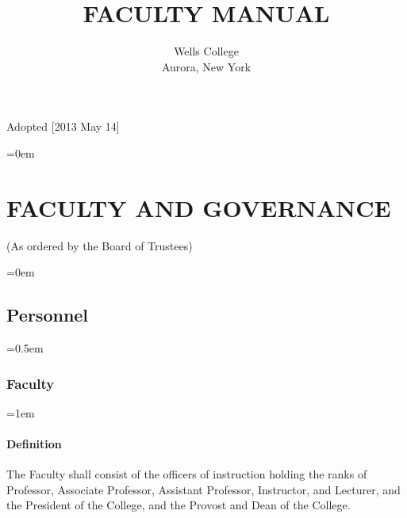 \documentclass{manual}
\let\stdsection\section %
\renewcommand\section{\newpage\stdsection}
\let\oldsection\section
\renewcommand\section{\leftskip=0em\oldsection}
\let\oldsubsection\subsection
\renewcommand\subsection{\leftskip=0em\oldsubsection}
\let\oldsubsubsection\subsubsection
\renewcommand\subsubsection{\leftskip=0.5em\oldsubsubsection}
\let\oldparagraph\paragraph
\renewcommand\paragraph{\leftskip=1em\oldparagraph}
\begin{document}
\title{FACULTY MANUAL}

\author{Wells College\\Aurora, New York}

\maketitle
  \vfill
  \begin{center}
  Adopted [2013 May 14]
  \end{center}

\newpage

\pagestyle{fancy}
\fancyhead[R]{\thepage \addtocounter{articlePage}{1}}

\tableofcontents
\newpage

\fancyfoot[C]{\thesection-\thearticlePage}

\section{FACULTY AND GOVERNANCE}\label{art:FacultyAndGovernance}
\begin{center}(As ordered by the Board of Trustees)\end{center}


\subsection{Personnel}\label{sec:Personnel}


\subsubsection{Faculty}\label{sub:Faculty}


\paragraph{Definition}
The Faculty shall consist of the officers of instruction holding the ranks of Professor, Associate Professor, Assistant Professor, Instructor, and Lecturer, and the President of the College, and the Provost and Dean of the College.
\end{document}
